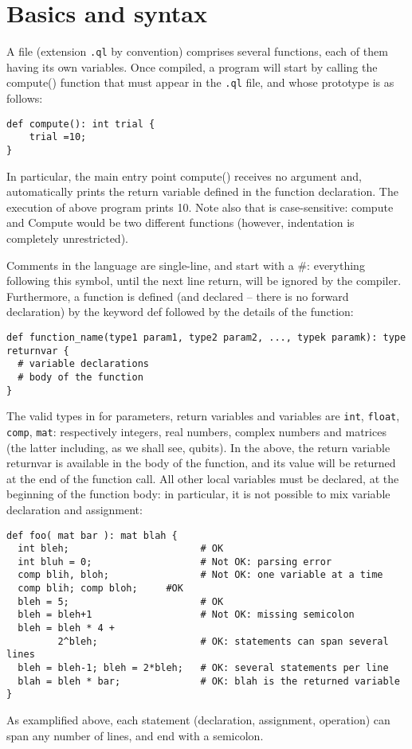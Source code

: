 \section{Basics and syntax}

A \QL file (extension \texttt{.ql} by convention) comprises several functions, each of them having its own variables. Once compiled, a program will start by calling the \textsf{compute()} function that must appear in the \texttt{.ql} file, and whose prototype is as follows:
\begin{lstlisting}
def compute(): int trial {
 	trial =10;
}
\end{lstlisting}
In particular, the main entry point \textsf{compute()} receives no argument and, automatically prints the return variable defined in the function declaration. The execution of above program prints 10.
Note also that \QL is case-sensitive: \textsf{compute} and \textsf{Compute} would be two different functions (however, indentation is completely unrestricted).

Comments in the language are single-line, and start with a \#: everything following this symbol, until the next line return, will be ignored by the compiler. Furthermore, a function is defined (and declared -- there is no forward declaration) by the keyword \textsf{def} followed by the details of the function:
\begin{lstlisting}
def function_name(type1 param1, type2 param2, ..., typek paramk): type returnvar {
  # variable declarations
  # body of the function
}
\end{lstlisting}
The valid types  in \QL for parameters, return variables and variables are \texttt{int}, \texttt{float}, \texttt{comp}, \texttt{mat}: respectively integers, real numbers, complex numbers and matrices (the latter including, as we shall see, qubits). In the above, the return variable \textsf{returnvar} is available in the body of the function, and its value will be returned at the end of the function call. All other local variables must be declared, at the beginning of the function body: in particular, it is not possible to mix variable declaration and assignment:
\begin{lstlisting}
def foo( mat bar ): mat blah {
  int bleh;                       # OK
  int bluh = 0;                   # Not OK: parsing error
  comp blih, bloh;                # Not OK: one variable at a time
  comp blih; comp bloh;		#OK
  bleh = 5;                       # OK
  bleh = bleh+1                   # Not OK: missing semicolon
  bleh = bleh * 4 +
         2^bleh;                  # OK: statements can span several lines
  bleh = bleh-1; bleh = 2*bleh;   # OK: several statements per line
  blah = bleh * bar;              # OK: blah is the returned variable
}
\end{lstlisting}
As examplified above, each statement (declaration, assignment, operation) can span any number of lines, and end with a semicolon.

